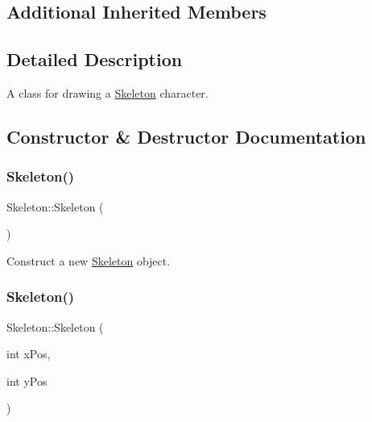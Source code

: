\subsection*{Additional Inherited Members}


\subsection{Detailed Description}
A class for drawing a \mbox{\hyperlink{classSkeleton}{Skeleton}} character. 



\subsection{Constructor \& Destructor Documentation}
\mbox{\label{classSkeleton_af01a02f1ce9ae4c801cd6e66ccf7407f}} 
\subsubsection{\texorpdfstring{Skeleton()}{Skeleton()}\hspace{0.1cm}{\footnotesize\ttfamily [1/3]}}
{\footnotesize\ttfamily Skeleton\+::\+Skeleton (\begin{DoxyParamCaption}{ }\end{DoxyParamCaption})}



Construct a new \mbox{\hyperlink{classSkeleton}{Skeleton}} object. 

\mbox{\label{classSkeleton_a71cc79a27794a470070b3d8691b8e716}} 
\subsubsection{\texorpdfstring{Skeleton()}{Skeleton()}\hspace{0.1cm}{\footnotesize\ttfamily [2/3]}}
{\footnotesize\ttfamily Skeleton\+::\+Skeleton (\begin{DoxyParamCaption}\item[{int}]{x\+Pos,  }\item[{int}]{y\+Pos }\end{DoxyParamCaption})}



